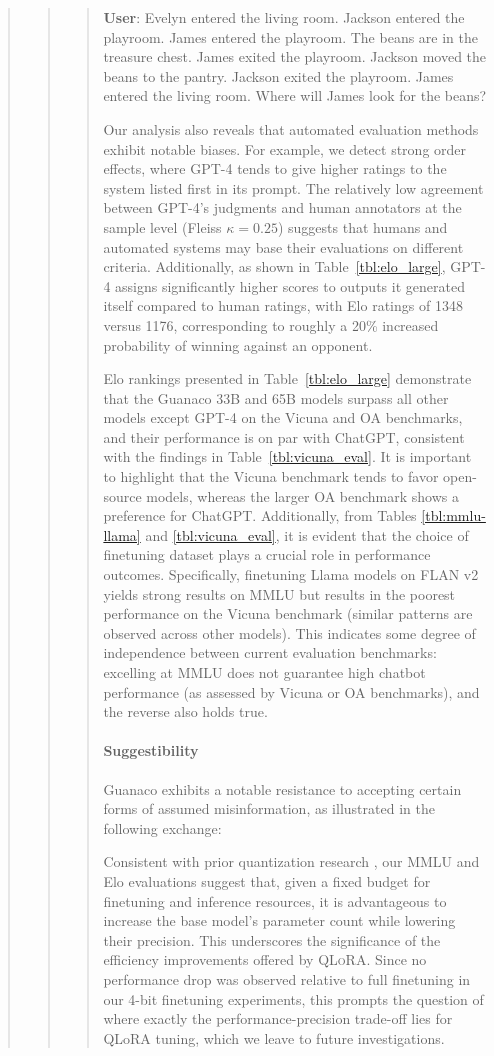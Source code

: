 \begin{quote}
\begin{quote}
\begin{quote}
    \textbf{User}: Evelyn entered the living room. Jackson entered the playroom. James entered the playroom. The beans are in the treasure chest. James exited the playroom. Jackson moved the beans to the pantry. Jackson exited the playroom. James entered the living room. Where will James look for the beans?

Our analysis also reveals that automated evaluation methods exhibit notable biases. For example, we detect strong order effects, where GPT-4 tends to give higher ratings to the system listed first in its prompt. The relatively low agreement between GPT-4’s judgments and human annotators at the sample level (Fleiss $\kappa=0.25$) suggests that humans and automated systems may base their evaluations on different criteria. Additionally, as shown in Table~\ref{tbl:elo_large}, GPT-4 assigns significantly higher scores to outputs it generated itself compared to human ratings, with Elo ratings of 1348 versus 1176, corresponding to roughly a 20\% increased probability of winning against an opponent.

Elo rankings presented in Table~\ref{tbl:elo_large} demonstrate that the {Guanaco} 33B and 65B models surpass all other models except GPT-4 on the Vicuna and OA benchmarks, and their performance is on par with ChatGPT, consistent with the findings in Table~\ref{tbl:vicuna_eval}. It is important to highlight that the Vicuna benchmark tends to favor open-source models, whereas the larger OA benchmark shows a preference for ChatGPT. Additionally, from Tables \ref{tbl:mmlu-llama} and \ref{tbl:vicuna_eval}, it is evident that the choice of finetuning dataset plays a crucial role in performance outcomes. Specifically, finetuning Llama models on FLAN v2 yields strong results on MMLU but results in the poorest performance on the Vicuna benchmark (similar patterns are observed across other models). This indicates some degree of independence between current evaluation benchmarks: excelling at MMLU does not guarantee high chatbot performance (as assessed by Vicuna or OA benchmarks), and the reverse also holds true.

\paragraph{Suggestibility} {Guanaco} exhibits a notable resistance to accepting certain forms of assumed misinformation, as illustrated in the following exchange:

Consistent with prior quantization research \citep{dettmers2022case}, our MMLU and Elo evaluations suggest that, given a fixed budget for finetuning and inference resources, it is advantageous to increase the base model’s parameter count while lowering their precision. This underscores the significance of the efficiency improvements offered by \textsc{QLoRA}. Since no performance drop was observed relative to full finetuning in our 4-bit finetuning experiments, this prompts the question of where exactly the performance-precision trade-off lies for QLoRA tuning, which we leave to future investigations.


\end{quote}
\end{quote}
\end{quote}
